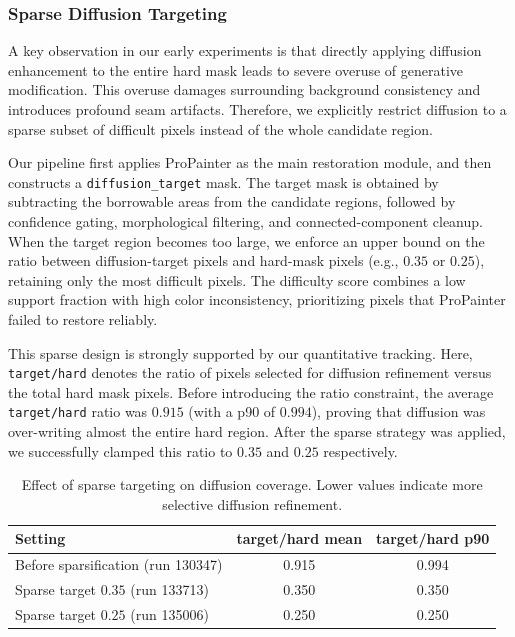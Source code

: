 \subsubsection{Sparse Diffusion Targeting}

A key observation in our early experiments is that directly applying diffusion enhancement to the entire hard mask leads to severe overuse of generative modification. This overuse damages surrounding background consistency and introduces profound seam artifacts. Therefore, we explicitly restrict diffusion to a sparse subset of difficult pixels instead of the whole candidate region.

Our pipeline first applies ProPainter as the main restoration module, and then constructs a \texttt{diffusion\_target} mask. The target mask is obtained by subtracting the borrowable areas from the candidate regions, followed by confidence gating, morphological filtering, and connected-component cleanup. When the target region becomes too large, we enforce an upper bound on the ratio between diffusion-target pixels and hard-mask pixels (e.g., $0.35$ or $0.25$), retaining only the most difficult pixels. The difficulty score combines a low support fraction with high color inconsistency, prioritizing pixels that ProPainter failed to restore reliably.

This sparse design is strongly supported by our quantitative tracking. Here, \texttt{target/hard} denotes the ratio of pixels selected for diffusion refinement versus the total hard mask pixels. Before introducing the ratio constraint, the average \texttt{target/hard} ratio was $0.915$ (with a p90 of $0.994$), proving that diffusion was over-writing almost the entire hard region. After the sparse strategy was applied, we successfully clamped this ratio to $0.35$ and $0.25$ respectively.

\begin{table}[h]
\centering
\caption{Effect of sparse targeting on diffusion coverage. Lower values indicate more selective diffusion refinement.}
\label{tab:sparse_target}
\begin{tabular}{lcc}
\toprule
Setting & target/hard mean & target/hard p90 \\
\midrule
Before sparsification (run 130347) & 0.915 & 0.994 \\
Sparse target $0.35$ (run 133713) & 0.350 & 0.350 \\
Sparse target $0.25$ (run 135006) & 0.250 & 0.250 \\
\bottomrule
\end{tabular}
\end{table}

